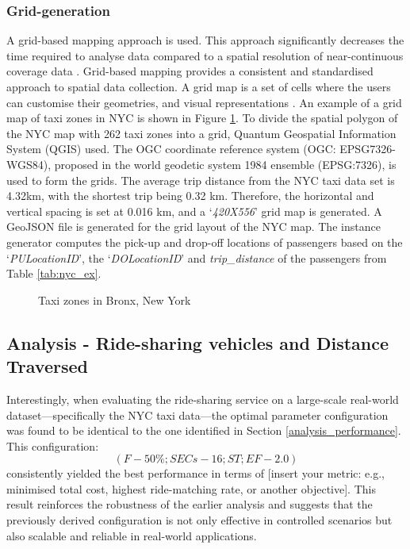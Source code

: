 \subsubsection{Grid-generation}
A grid-based mapping approach is used. This approach significantly decreases the time required to analyse data compared to a spatial resolution of near-continuous coverage data \cite{gridmap}. Grid-based mapping provides a consistent and standardised approach to spatial data collection. A grid map is a set of cells where the users can customise their geometries, and visual representations \cite{nyc_geo_study}. An example of a grid map of taxi zones in NYC is shown in Figure \ref{fig:attributes_grid}.
To divide the spatial polygon of the NYC map with 262 taxi zones \cite{nyctaxi} into a grid, Quantum Geospatial Information System (QGIS) used.
The OGC coordinate reference system (OGC: EPSG7326-WGS84), proposed in the world geodetic system 1984 ensemble (EPSG:7326), is used to form the grids. The average trip distance from the NYC taxi data set is 4.32km, with the shortest trip being 0.32 km. Therefore, the horizontal and vertical spacing is set at 0.016 km, and a `\textit{420X556}' grid map is generated. A  GeoJSON file is generated for the grid layout of the NYC map. The instance generator computes the pick-up and drop-off locations of passengers based on the `\textit{PULocationID}', the `\textit{DOLocationID}' and \textit{trip\_distance} of the passengers from Table \ref{tab:nyc_ex}.
\begin{figure}[t]
  \vspace{-0.2cm}
  \centering
   {}
   \caption{Taxi zones in Bronx, New York \cite{nyc_data}}
    \label{fig:attributes_grid}
  \vspace{-0.1cm}
\end{figure}


\subsection{Analysis - Ride-sharing vehicles and Distance Traversed}
\label{sec:analysis_distance}

Interestingly, when evaluating the ride-sharing service on a large-scale real-world dataset—specifically the NYC taxi data—the optimal parameter configuration was found to be identical to the one identified in Section \ref{analysis_performance}. This configuration:
\[
(F - 50\%; SECs - 16; ST; EF - 2.0) 
\]
consistently yielded the best performance in terms of [insert your metric: e.g., minimised total cost, highest ride-matching rate, or another objective]. This result reinforces the robustness of the earlier analysis and suggests that the previously derived configuration is not only effective in controlled scenarios but also scalable and reliable in real-world applications.

